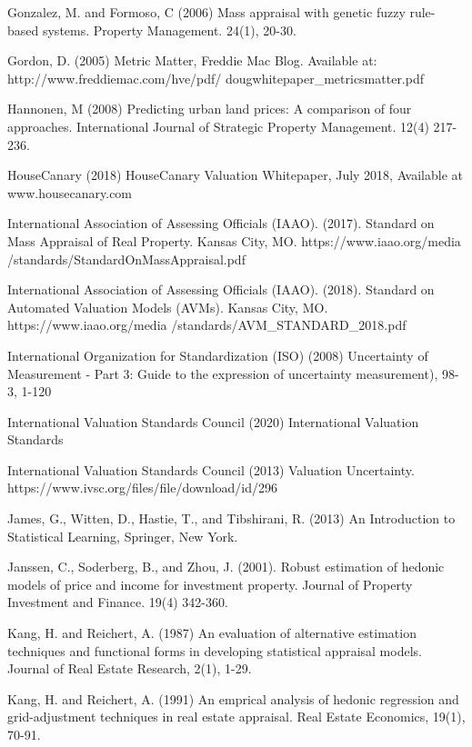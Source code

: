\documentclass[colTwo]{anon}
\theoremstyle{definition}
\begin{document}
\begin{thebibliography}{50}
\harvarditem{}{}{}Gonzalez, M. and Formoso, C (2006) Mass appraisal with genetic fuzzy rule-based systems. Property Management. 24(1), 20-30.

\harvarditem{}{}{}Gordon, D. (2005) Metric Matter, Freddie Mac Blog. Available at: http://www.freddiemac.com/hve/pdf/ dougwhitepaper\_metricsmatter.pdf

\harvarditem{}{}{}Hannonen, M (2008) Predicting urban land prices: A comparison of four approaches. International Journal of Strategic Property Management. 12(4) 217-236.

\harvarditem{}{}{}HouseCanary (2018) HouseCanary Valuation Whitepaper, July 2018, Available at www.housecanary.com

\harvarditem{}{}{}International Association of Assessing Officials (IAAO). (2017). Standard on Mass Appraisal of Real Property. Kansas City, MO. https://www.iaao.org/media /standards/StandardOnMassAppraisal.pdf

\harvarditem{}{}{}International Association of Assessing Officials (IAAO). (2018). Standard on Automated Valuation Models (AVMs). Kansas City, MO. https://www.iaao.org/media /standards/AVM\_STANDARD\_2018.pdf

\harvarditem{}{}{} International Organization for Standardization (ISO) (2008) Uncertainty of Measurement - Part 3: Guide to the expression of uncertainty measurement), 98-3, 1-120

\harvarditem{}{}{}International Valuation Standards Council (2020) International Valuation Standards

\harvarditem{}{}{}International Valuation Standards Council (2013) Valuation Uncertainty. https://www.ivsc.org/files/file/download/id/296

\harvarditem{}{}{}James, G., Witten, D., Hastie, T., and Tibshirani, R.  (2013) An Introduction to Statistical Learning, Springer, New York.

\harvarditem{}{}{}Janssen, C., Soderberg, B., and Zhou, J. (2001). Robust estimation of hedonic models of price and income for investment property. Journal of Property Investment and Finance. 19(4) 342-360.

\harvarditem{}{}{}Kang, H. and Reichert, A. (1987) An evaluation of alternative estimation techniques and functional forms in developing statistical appraisal models. Journal of Real Estate Research, 2(1), 1-29.

\harvarditem{}{}{}Kang, H. and Reichert, A. (1991) An emprical analysis of hedonic regression and grid-adjustment techniques in real estate appraisal. Real Estate Economics, 19(1), 70-91.


\end{thebibliography}
\end{document}
